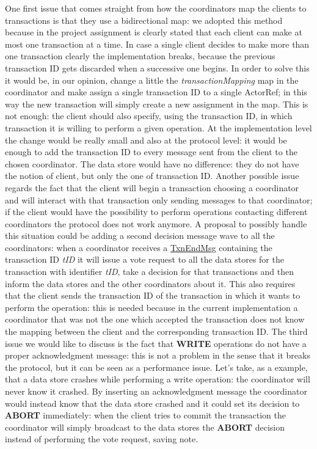 One first issue that comes straight from how the coordinators map the clients to transactions is that they use a bidirectional map: we adopted this method because in the project assignment is clearly stated that each client can make at most one transaction at a time. In case a single client decides to make more than one transaction clearly the implementation breaks, because the previous transaction ID gets discarded when a successive one begins. In order to solve this it would be, in our opinion, change a little the \textit{transactionMapping} map in the coordinator and make assign a single transaction ID to a single ActorRef; in this way the new transaction will simply create a new assignment in the map. This is not enough: the client should also specify, using the transaction ID, in which transaction it is willing to perform a given operation. At the implementation level the change would be really small and also at the protocol level: it would be enough to add the transaction ID to every message sent from the client to the chosen coordinator. The data store would have no difference: they do not have the notion of client, but only the one of transaction ID.
\newline
Another possible issue regards the fact that the client will begin a transaction choosing a coordinator and will interact with that transaction only sending messages to that coordinator; if the client would have the possibility to perform operations contacting different coordinators the protocol does not work anymore. A proposal to possibly handle this situation could be adding a second decision message wave to all the coordinators: when a coordinator receives a \url{TxnEndMsg} containing the transaction ID \textit{tID} it will issue a vote request to all the data stores for the transaction with identifier \textit{tID}, take a decision for that transactions and then inform the data stores and the other coordinators about it. This also requires that the client sends the transaction ID of the transaction in which it wants to perform the operation: this is needed because in the current implementation a coordinator that was not the one which accepted the transaction does not know the mapping between the client and the corresponding transaction ID.
\newline
The third issue we would like to discuss is the fact that \textbf{WRITE} operations do not have a proper acknowledgment message: this is not a problem in the sense that it breaks the protocol, but it can be seen as a performance issue.
Let's take, as a example, that a data store crashes while performing a write operation: the coordinator will never know it crashed. By inserting an acknowledgment message the coordinator would instead know that the data store crashed and it could set its decision to \textbf{ABORT} immediately: when the client tries to commit the transaction the coordinator will simply broadcast to the data stores the \textbf{ABORT} decision instead of performing the vote request, saving note.
